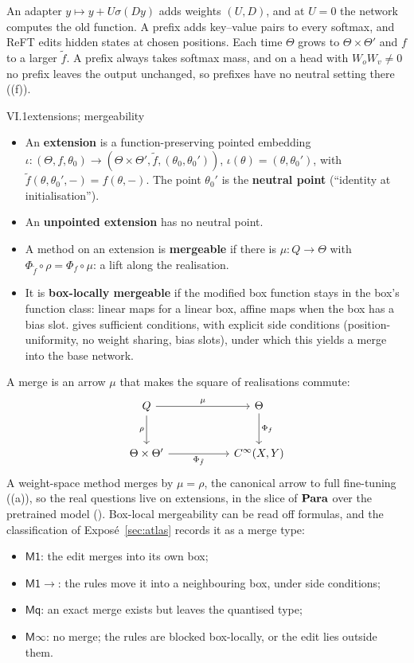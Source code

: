 An adapter $y\mapsto y+U\sigma(Dy)$ \citep{houlsby2019parameter} adds weights $(U,D)$, and at $U=0$ the network
computes the old function. A prefix \citep{li2021prefix} adds key--value pairs to every softmax, and ReFT
\citep{wu2024reft} edits hidden states at chosen positions. Each time $\Theta$ grows to $\Theta\times\Theta'$ and $f$ to
a larger $\tilde f$. A prefix always takes softmax mass, and on a head with $W_oW_v\ne0$ no prefix leaves the output
unchanged, so prefixes have no neutral setting there ((f)).

\begin{definition}{VI.1}{extensions; mergeability}
\begin{itemize}
  \item An \textbf{extension} is a function-preserving pointed embedding
  $\iota:(\Theta,f,\theta_0)\to(\Theta\times\Theta',\tilde f,(\theta_0,\theta_0'))$, $\iota(\theta)=(\theta,\theta_0')$,
  with $\tilde f(\theta,\theta_0',-)=f(\theta,-)$. The point $\theta_0'$ is the \textbf{neutral point} (``identity at
  initialisation'').
  \item An \textbf{unpointed extension} has no neutral point.
  \item A method on an extension is \textbf{mergeable} if there is $\mu:Q\to\Theta$ with
  $\Phi_{\tilde f}\circ\rho=\Phi_f\circ\mu$: a lift along the realisation.
  \item It is \textbf{box-locally mergeable} if the modified box function stays in the box's function class: linear
  maps for a linear box, affine maps when the box has a bias slot.  gives sufficient conditions,
  with explicit side conditions (position-uniformity, no weight sharing, bias slots), under which this yields a merge
  into the base network.
\end{itemize}
\end{definition}

A merge is an arrow $\mu$ that makes the square of realisations commute:
\[
\begin{tikzcd}[column sep=5.5em,row sep=2.6em]
  Q \arrow[r,"\mu"] \arrow[d,"\rho"'] & \Theta \arrow[d,"\Phi_f"] \\
  \Theta\times\Theta' \arrow[r,"\Phi_{\tilde f}"'] & C^\infty(X,Y)
\end{tikzcd}
\]
A weight-space method merges by $\mu=\rho$, the canonical arrow to full fine-tuning ((a)), so
the real questions live on extensions, in the slice of $\mathbf{Para}$ over the pretrained model ().
Box-local mergeability can be read off formulas, and the classification of Exposé~\ref{sec:atlas} records it as a merge
type:
\begin{itemize}
  \item $\mathsf{M1}$: the edit merges into its own box;
  \item $\mathsf{M1}{\rightarrow}$: the rules move it into a neighbouring box, under side conditions;
  \item $\mathsf{Mq}$: an exact merge exists but leaves the quantised type;
  \item $\mathsf{M}\infty$: no merge; the rules are blocked box-locally, or the edit lies outside them.
\end{itemize}

